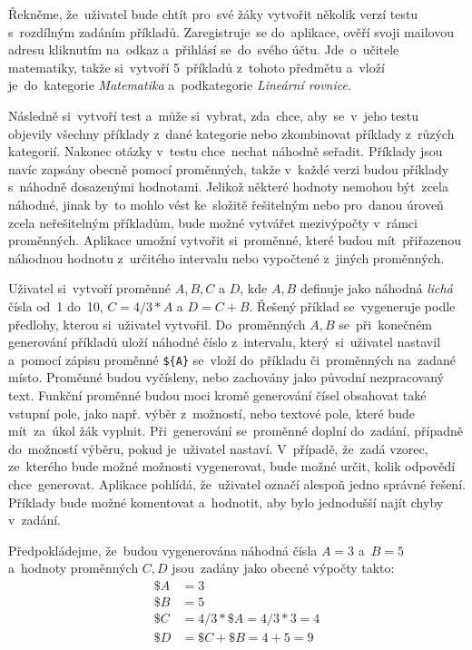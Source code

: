\documentclass[10pt,a4paper]{article}
\begin{document}
            Řekněme, že~uživatel bude chtít pro~své žáky vytvořit několik verzí testu s~rozdílným zadáním příkladů. Zaregistruje~se do~aplikace, ověří svoji mailovou adresu kliknutím na~odkaz a~přihlásí se~do~svého účtu. Jde~o~učitele matematiky, takže si~vytvoří 5~příkladů z~tohoto předmětu a~vloží je~do~kategorie \emph{Matematika} a~podkategorie \emph{Lineární rovnice}.

            Následně si~vytvoří test a~může si~vybrat, zda~chce, aby~se~v~jeho testu objevily všechny příklady z~dané kategorie nebo zkombinovat příklady z~růzých kategorií. Nakonec otázky v~testu chce~nechat náhodně seřadit. Příklady jsou navíc zapsány obecně pomocí proměnných, takže v~každé verzi budou příklady s~náhodně dosazenými hodnotami. Jelikož některé hodnoty nemohou být~zcela náhodné, jinak by~to mohlo vést ke~složitě řešitelným nebo pro~danou úroveň zcela neřešitelným příkladům, bude možné vytvářet mezivýpočty v~rámci proměnných. Aplikace umožní vytvořit si~proměnné, které budou mít~přiřazenou náhodnou hodnotu z~určitého intervalu nebo vypočtené z~jiných proměnných.

            Uživatel si~vytvoří proměnné $A, B, C$ a $D$, kde $A, B$ definuje jako náhodná \emph{lichá} čísla od~1 do~10, $C = 4/3*A$ a $D = C + B$. Řešený příklad se~vygeneruje podle předlohy, kterou si~uživatel vytvořil. Do~proměnných $A, B$ se~při~konečném generování příkladů uloží náhodné číslo z~intervalu, který~si~uživatel nastavil a~pomocí zápisu proměnné \texttt{\$\{A\}} se~vloží do~příkladu či~proměnných na~zadané místo. Proměnné budou vyčísleny, nebo zachovány jako původní nezpracovaný text. Funkční proměnné budou moci kromě generování čísel obsahovat také vstupní pole, jako např. výběr z~možností, nebo textové pole, které bude mít~za~úkol žák vyplnit. Při~generování se~proměnné doplní do~zadání, případně do~možností výběru, pokud je~uživatel nastaví. V~případě, že~zadá vzorec, ze~kterého bude možné možnosti vygenerovat, bude možné určit, kolik odpovědí chce~generovat. Aplikace pohlídá, že~uživatel označí alespoň jedno správné řešení. Příklady bude možné komentovat a~hodnotit, aby bylo jednodušší najít chyby v~zadání.
            
            Předpokládejme, že~budou vygenerována náhodná čísla $A = 3$ a~$B = 5$ a~hodnoty proměnných $C, D$ jsou~zadány jako obecné výpočty takto:
            \begin{align*}
                \$A &= 3 \\
                \$B &= 5 \\
                \$C &= 4/3*\$A = 4/3*3 = 4 \\
                \$D &= \$C + \$B = 4 + 5 = 9
            \end{align*}
\end{document}

